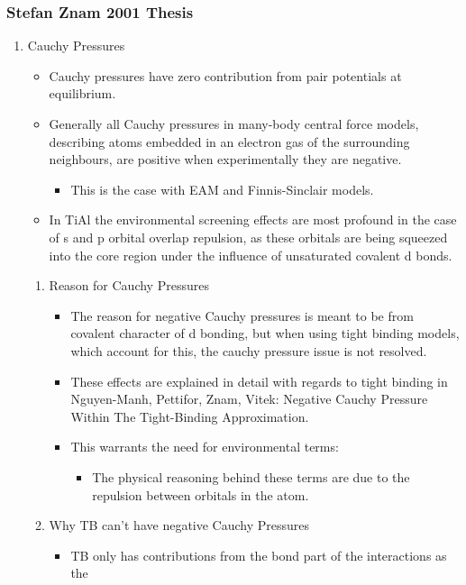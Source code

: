 \documentclass[11pt]{article}
\begin{document}
\subsubsection{Stefan Znam 2001 Thesis}
\label{sec-2-6-3}
\begin{enumerate}
\item Cauchy Pressures
\label{sec-2-6-3-1}
\begin{itemize}
\item Cauchy pressures have zero contribution from pair potentials at
equilibrium.
\item Generally all Cauchy pressures in many-body central force models,
describing atoms embedded in an electron gas of the surrounding
neighbours, are positive when experimentally they are negative.
\begin{itemize}
\item This is the case with EAM and Finnis-Sinclair models.
\end{itemize}
\item In TiAl the environmental screening effects are most profound in the
case of s and p orbital overlap repulsion, as these orbitals are being
squeezed into the core region under the influence of unsaturated
covalent d bonds.
\end{itemize}
\begin{enumerate}
\item Reason for Cauchy Pressures
\label{sec-2-6-3-1-1}
\begin{itemize}
\item The reason for negative Cauchy pressures is meant to be from covalent
character of d bonding, but when using tight binding models, which
account for this, the cauchy pressure issue is not resolved.
\item These effects are explained in detail with regards to tight binding in
Nguyen-Manh, Pettifor, Znam, Vitek: Negative Cauchy Pressure Within
The Tight-Binding Approximation.
\item This warrants the need for environmental terms:
\begin{itemize}
\item The physical reasoning behind these terms are due to the repulsion
between orbitals in the atom.
\end{itemize}
\end{itemize}
\item Why TB can't have negative Cauchy Pressures
\label{sec-2-6-3-1-2}
\begin{itemize}
\item TB only has contributions from the bond part of the interactions as the

\end{itemize}
\end{enumerate}
\end{enumerate}
\end{document}

